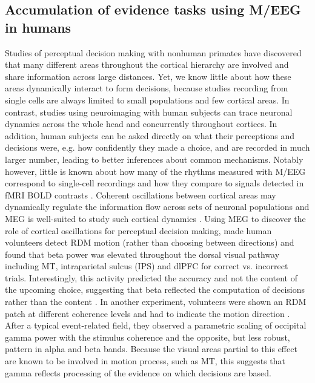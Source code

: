 \subsection{Accumulation of evidence tasks using M/EEG in humans}
Studies of perceptual decision making with nonhuman primates have discovered that many different areas throughout the cortical hierarchy are involved and share information across large distances. Yet, we know little about how these areas dynamically interact to form decisions, because studies recording from single cells are always limited to small populations and few cortical areas. In contrast, studies using neuroimaging with human subjects can trace neuronal dynamics across the whole head and concurrently throughout cortices. In addition, human subjects can be asked directly on what their perceptions and decisions were, e.g. how confidently they made a choice, and are recorded in much larger number, leading to better inferences about common mechanisms. Notably however, little is known about how many of the rhythms measured with M/EEG correspond to single-cell recordings and how they compare to signals detected in fMRI BOLD contrasts \parencite{Buzsaki2012,Jann2010,Keller2013,Lee2014,Logothetis2001,Scheeringa2011,Whittingstall2009}. 
Coherent oscillations between cortical areas may dynamically regulate the information flow across sets of neuronal populations \parencite{Engel2001,Fries2015,Salinas2001,Sejnowski2006,Varela2001} and MEG is well-suited to study such cortical dynamics \parencite{Siegel2011}. Using MEG to discover the role of cortical oscillations for perceptual decision making, \textcite{Donner2007} made human volunteers detect RDM motion (rather than choosing between directions) and found that beta power was elevated throughout the dorsal visual pathway including MT, intraparietal sulcus (IPS) and dlPFC for correct vs. incorrect trials. Interestingly, this activity predicted the accuracy and not the content of the upcoming choice, suggesting that beta reflected the computation of decisions rather than the content \parencite{Donner2007,Siegel2011}. In another experiment, volunteers were shown an RDM patch at different coherence levels and had to indicate the motion direction \parencite{Siegel2007}. After a typical event-related field, they observed a parametric scaling of occipital gamma power with the stimulus coherence and the opposite, but less robust, pattern in alpha and beta bands. Because the visual areas partial to this effect are known to be involved in motion process, such as MT, this suggests that gamma reflects processing of the evidence on which decisions are based. 
